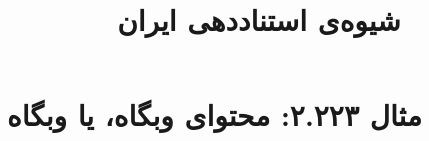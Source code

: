 \documentclass[a4paper,10pt]{article}
\begin{document}
\title{شیوه‌ی استناددهی ایران
 }
\author{}
\date{}
\maketitle



\section*{مثال ۲.۲۲۳: محتوای وبگاه، یا وبگاه}

\cite{کتابخانه1385}\\
\cite{روانشناسی1385}\\
\cite{evaston2000}\\
\cite{fas2000}\\






\end{document}
